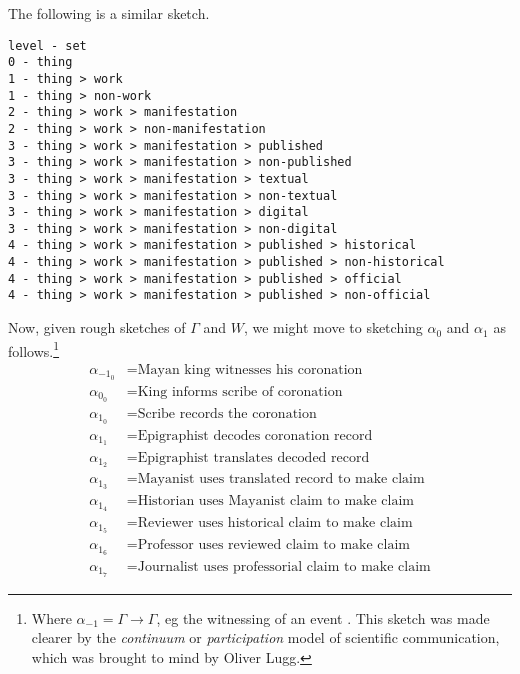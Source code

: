 \documentclass{amsart}%
\newcommand{\mention}[1]{\textit{#1}}%
\theoremstyle{plain}
\theoremstyle{definition}
\theoremstyle{remark}
\theoremstyle{definition}
\theoremstyle{remark}
\begin{document}
The following is a similar sketch.
\begin{verbatim}
level - set
0 - thing
1 - thing > work
1 - thing > non-work
2 - thing > work > manifestation
2 - thing > work > non-manifestation
3 - thing > work > manifestation > published
3 - thing > work > manifestation > non-published
3 - thing > work > manifestation > textual
3 - thing > work > manifestation > non-textual
3 - thing > work > manifestation > digital
3 - thing > work > manifestation > non-digital
4 - thing > work > manifestation > published > historical
4 - thing > work > manifestation > published > non-historical
4 - thing > work > manifestation > published > official
4 - thing > work > manifestation > published > non-official
\end{verbatim}

Now, given rough sketches of \(\Gamma\) and \(W\), we might move to sketching \(\alpha_0\) and \(\alpha_1\) as follows.\footnote{Where \(\alpha_{-1} = \Gamma\to\Gamma\), eg the witnessing of an event%
. This sketch was made clearer by the \mention{continuum} or \mention{participation} model of scientific communication, which was brought to mind by Oliver Lugg.%
}
\begin{align*}
\alpha_{-1_0} &= \text{Mayan king witnesses his coronation} \\%
\alpha_{0_0} &= \text{King informs scribe of coronation} \\%
\alpha_{1_0} &= \text{Scribe records the coronation}\\%
\alpha_{1_1} &= \text{Epigraphist decodes coronation record}\\%
\alpha_{1_2} &= \text{Epigraphist translates decoded record}\\%
\alpha_{1_3} &= \text{Mayanist uses translated record to make claim}\\%
\alpha_{1_4} &= \text{Historian uses Mayanist claim to make claim}\\%
\alpha_{1_5} &= \text{Reviewer uses historical claim to make claim}\\%
\alpha_{1_6} &= \text{Professor uses reviewed claim to make claim}\\
\alpha_{1_7} &= \text{Journalist uses professorial claim to make claim}
\end{align*}
\end{document}
